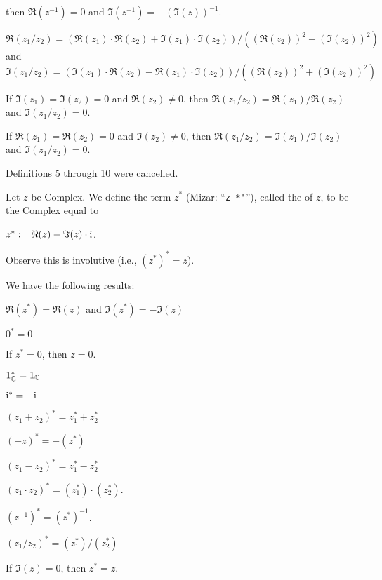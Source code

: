 \documentclass{article}
\begin{document}
\begin{thm}
  then $\Re(z^{-1})=0$ and $\Im(z^{-1})=-(\Im(z))^{-1}$.
\item\label{complex1:24} $\Re(z_{1}/z_{2})=(\Re(z_{1})\cdot\Re(z_{2})+\Im(z_{1})\cdot\Im(z_{2}))/((\Re(z_{2}))^{2}+(\Im(z_{2}))^{2})$
  and $\Im(z_{1}/z_{2})=(\Im(z_{1})\cdot\Re(z_{2})-\Re(z_{1})\cdot\Im(z_{2}))/((\Re(z_{2}))^{2}+(\Im(z_{2}))^{2})$
\item\label{complex1:25} If $\Im(z_{1})=\Im(z_{2})=0$ and $\Re(z_{2})\neq0$,
  then $\Re(z_{1}/z_{2})=\Re(z_{1})/\Re(z_{2})$ and $\Im(z_{1}/z_{2})=0$.
\item\label{complex1:26} If $\Re(z_{1})=\Re(z_{2})=0$ and $\Im(z_{2})\neq0$,
  then $\Re(z_{1}/z_{2})=\Im(z_{1})/\Im(z_{2})$ and $\Im(z_{1}/z_{2})=0$.
\end{thm}

Definitions 5 through 10 were cancelled.

\begin{definition}
Let $z$ be Complex.
We define the term $z^{*}$ (Mizar: ``\verb#z *'#''), called the
 of $z$, to be the Complex
equal to
\begin{defn}[start=11]
\item $z^{*}:=\Re(z)-\Im(z)\cdot\mathrm{i}$.
\end{defn}
Observe this is involutive (i.e., $(z^{*})^{*}=z$).
\end{definition}

We have the following results:
\begin{thm}
\item\label{complex1:27} $\Re(z^{*})=\Re(z)$ and $\Im(z^{*})=-\Im(z)$
\item\label{complex1:28} $0^{*}=0$
\item\label{complex1:29} If $z^{*}=0$, then $z=0$.
\item\label{complex1:30} $1_{\mathbb{C}}^{*}=1_{\mathbb{C}}$
\item\label{complex1:31} $\mathrm{i}^{*}=-\mathrm{i}$
\item\label{complex1:32} $(z_{1}+z_{2})^{*}=z_{1}^{*}+z_{2}^{*}$
\item\label{complex1:33} $(-z)^{*}=-(z^{*})$
\item\label{complex1:34} $(z_{1}-z_{2})^{*}=z_{1}^{*}-z_{2}^{*}$
\item\label{complex1:35} $(z_{1}\cdot z_{2})^{*}=(z_{1}^{*})\cdot(z_{2}^{*})$.
\item\label{complex1:36} $(z^{-1})^{*}=(z^{*})^{-1}$.
\item\label{complex1:37} $(z_{1}/z_{2})^{*}=(z_{1}^{*})/(z_{2}^{*})$
\item\label{complex1:38} If $\Im(z)=0$, then $z^{*}=z$.
\end{thm}
\end{document}
